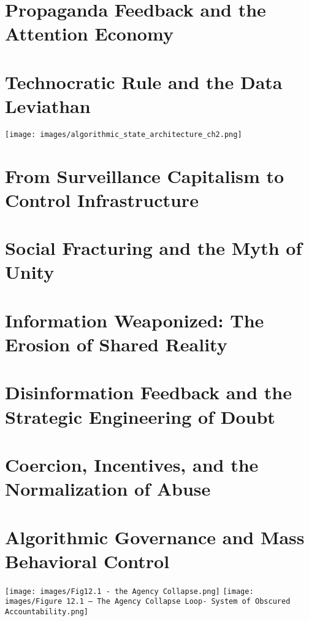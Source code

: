 \documentclass[12pt]{book}
\begin{document}
\chapter{Propaganda Feedback and the Attention Economy}


\chapter{Technocratic Rule and the Data Leviathan}
\texttt{[image: images/algorithmic\_state\_architecture\_ch2.png]}


\chapter{From Surveillance Capitalism to Control Infrastructure}


\chapter{Social Fracturing and the Myth of Unity}


\chapter{Information Weaponized: The Erosion of Shared Reality}


\chapter{Disinformation Feedback and the Strategic Engineering of Doubt}


\chapter{Coercion, Incentives, and the Normalization of Abuse}


\chapter{Algorithmic Governance and Mass Behavioral Control}
\texttt{[image: images/Fig12.1 - the Agency Collapse.png]}
\texttt{[image: images/Figure 12.1 – The Agency Collapse Loop- System of Obscured Accountability.png]}

\end{document}

